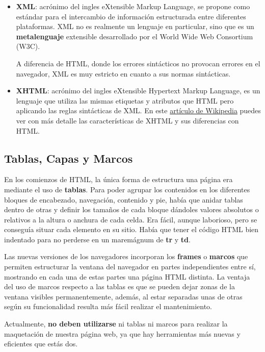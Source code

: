 \begin{itemize}
    \item \textbf{XML}: acrónimo del ingles eXtensible Markup Language, se propone como estándar para el intercambio de información estructurada entre diferentes plataformas. XML no es realmente un lenguaje en particular, sino que es un \textbf{metalenguaje }extensible desarrollado por el World Wide Web Consortium (W3C).

    A diferencia de HTML, donde los errores sintácticos no provocan errores en el navegador, XML es muy estricto en cuanto a sus normas sintácticas.

    \item \textbf{XHTML}: acrónimo del ingles eXtensible Hypertext Markup Language, es un lenguaje que utiliza las mismas etiquetas y atributos que HTML pero aplicando las reglas sintácticas de XML. En este \href{https://es.wikipedia.org/wiki/XHTML}{artículo de Wikipedia} puedes ver con más detalle las características de XHTML y sus diferencias con HTML.
\end{itemize}

\subsection{Tablas, Capas y Marcos}
En los comienzos de HTML, la única forma de estructura una página era mediante el uso de \textbf{tablas}. Para poder agrupar los contenidos en los diferentes bloques de encabezado, navegación, contenido y pie, había que anidar tablas dentro de otras y definir los tamaños de cada bloque dándoles valores absolutos o relativos a la altura o anchura de cada celda. Era fácil, aunque laborioso, pero se conseguía situar cada elemento en su sitio. Había que tener el código HTML bien indentado para no perderse en un maremágnum de \textbf{tr} y \textbf{td}.

Las nuevas versiones de los navegadores incorporan los \textbf{frames} o \textbf{marcos} que permiten estructurar la ventana del navegador en partes independientes entre sí, mostrando en cada una de estas partes una página HTML distinta. La ventaja del uso de marcos respecto a las tablas es que se pueden dejar zonas de la ventana visibles permanentemente, además, al estar separadas unas de otras según su funcionalidad resulta más fácil realizar el mantenimiento.

Actualmente, \textbf{no deben utilizarse} ni tablas ni marcos para realizar la maquetación de nuestra página web, ya que hay herramientas más nuevas y eficientes que estás dos.


